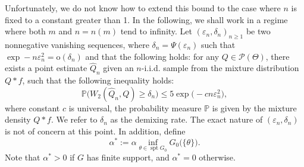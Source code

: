 \documentclass[MSNbibl,number,citesort]{arxbj}
\newcommand{\Pcal}{\mathscr{P}}
\newcommand{\Prob}{\mathbb{P}}
\newcommand{\supp}{\operatorname{spt}}
\newcommand{\hatQ}{\hat{Q}}
\begin{document}
Unfortunately, we do not know how to extend this bound to the
case where $n$ is fixed to a constant greater than 1.
In the following, we shall work in a regime where both
$m$ and $n = n(m)$ tend to infinity.
Let $(\varepsilon_n,\delta_n)_{n\geq1}$ be two nonnegative vanishing
sequences,
where $\delta_n = \Psi(\varepsilon_n)$
such that $\exp-n\varepsilon_n^2 = \mathrm{o}(\delta_n)$
and that the following holds:
for any $Q\in\Pcal(\Theta)$, there exists a point estimate
$\hatQ_n$ given an $n$-i.i.d. sample
from the mixture distribution $Q*f$, such that the following
inequality holds:
%
%
\begin{equation}
\label{Eqn-sample-bound} \Prob \bigl(W_2(\hatQ_n,Q) \geq
\delta_n \bigr) \leq5\exp \bigl(-c n\varepsilon_n^2
\bigr),
\end{equation}
%
where constant $c$ is universal, the probability measure $\Prob$
is given by the mixture density $Q*f$. We refer to $\delta_n$
as the demixing rate. The exact nature of
$(\varepsilon_n,\delta_n)$ is not of concern at this point.
%
In addition, define
%
\[
{\alpha^*}:= \alpha\inf_{\theta\in\supp G_0} G_0 \bigl(\{\theta
\} \bigr).
\]
%
Note that ${\alpha^*}> 0$ if $G$ has finite support, and ${\alpha^*}= 0$
otherwise.
\end{document}
